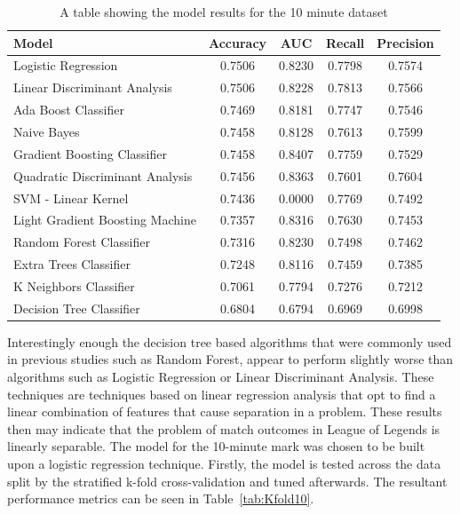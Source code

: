 \begin{table}[h!]
    \centering
    \begin{tabular}{l c c c c }
        \toprule
        \textbf{Model} & \textbf{Accuracy} & \textbf{AUC} & \textbf{Recall} & \textbf{Precision} \\
        \midrule
        Logistic Regression & 0.7506 & 0.8230 & 0.7798 & 0.7574  \\
        Linear Discriminant Analysis & 0.7506 & 0.8228 & 0.7813 & 0.7566 \\
        Ada Boost Classifier & 0.7469 & 0.8181 & 0.7747 & 0.7546 \\
        Naive Bayes & 0.7458 & 0.8128 & 0.7613 & 0.7599 \\
        Gradient Boosting Classifier & 0.7458 & 0.8407 & 0.7759 & 0.7529 \\
        Quadratic Discriminant Analysis & 0.7456 & 0.8363 & 0.7601 & 0.7604 \\
        SVM - Linear Kernel & 0.7436 & 0.0000 & 0.7769 & 0.7492 \\
        Light Gradient Boosting Machine & 0.7357 & 0.8316 & 0.7630 & 0.7453 \\
        Random Forest Classifier & 0.7316 & 0.8230 & 0.7498 & 0.7462 \\
        Extra Trees Classifier & 0.7248 & 0.8116 & 0.7459 & 0.7385  \\
        K Neighbors Classifier & 0.7061 & 0.7794 & 0.7276 & 0.7212  \\
        Decision Tree Classifier & 0.6804 & 0.6794 & 0.6969 & 0.6998 \\
        \bottomrule
    \end{tabular}
    \caption{A table showing the model results for the 10 minute dataset}
    \label{tab:ModelResults10}
\end{table}

Interestingly enough the decision tree based algorithms that were commonly used in previous studies such as Random Forest, appear to perform slightly worse than algorithms such as Logistic Regression or Linear Discriminant Analysis.
These techniques are techniques based on linear regression analysis that opt to find a linear combination of features that cause separation in a problem.
These results then may indicate that the problem of match outcomes in League of Legends is linearly separable.
The model for the 10-minute mark was chosen to be built upon a logistic regression technique.
Firstly, the model is tested across the data split by the stratified k-fold cross-validation and tuned afterwards.
The resultant performance metrics can be seen in Table~\ref{tab:Kfold10}. \\

